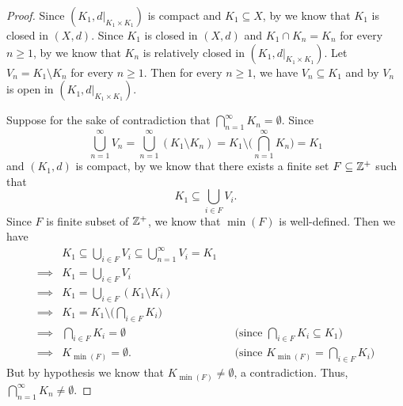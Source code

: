 \begin{proof}
  Since \((K_1, d|_{K_1 \times K_1})\) is compact and \(K_1 \subseteq X\), by  we know that \(K_1\) is closed in \((X, d)\).
  Since \(K_1\) is closed in \((X, d)\) and \(K_1 \cap K_n = K_n\) for every \(n \geq 1\), by  we know that \(K_n\) is relatively closed in \((K_1, d|_{K_1 \times K_1})\).
  Let \(V_n = K_1 \setminus K_n\) for every \(n \geq 1\).
  Then for every \(n \geq 1\), we have \(V_n \subseteq K_1\) and by  \(V_n\) is open in \((K_1, d|_{K_1 \times K_1})\).

  Suppose for the sake of contradiction that \(\bigcap_{n = 1}^\infty K_n = \emptyset\).
  Since
  \[
    \bigcup_{n = 1}^\infty V_n = \bigcup_{n = 1}^\infty (K_1 \setminus K_n) = K_1 \setminus \bigg(\bigcap_{n = 1}^\infty K_n\bigg) = K_1
  \]
  and \((K_1, d)\) is compact, by  we know that there exists a finite set \(F \subseteq \mathbb{Z}^+\) such that
  \[
    K_1 \subseteq \bigcup_{i \in F} V_i.
  \]
  Since \(F\) is finite subset of \(\mathbb{Z}^+\), we know that \(\min(F)\) is well-defined.
  Then we have
  \begin{align*}
             & K_1 \subseteq \bigcup_{i \in F} V_i \subseteq \bigcup_{n = 1}^\infty V_i = K_1                                                             \\
    \implies & K_1 = \bigcup_{i \in F} V_i                                                                                                                \\
    \implies & K_1 = \bigcup_{i \in F} (K_1 \setminus K_i)                                                                                                \\
    \implies & K_1 = K_1 \setminus \bigg(\bigcap_{i \in F} K_i\bigg)                                                                                      \\
    \implies & \bigcap_{i \in F} K_i = \emptyset                                              &  & \text{(since \(\bigcap_{i \in F} K_i \subseteq K_1)\)} \\
    \implies & K_{\min(F)} = \emptyset.                                                       &  & \text{(since \(K_{\min(F)} = \bigcap_{i \in F} K_i)\)}
  \end{align*}
  But by hypothesis we know that \(K_{\min(F)} \neq \emptyset\), a contradiction.
  Thus, \(\bigcap_{n = 1}^\infty K_n \neq \emptyset\).
\end{proof}

